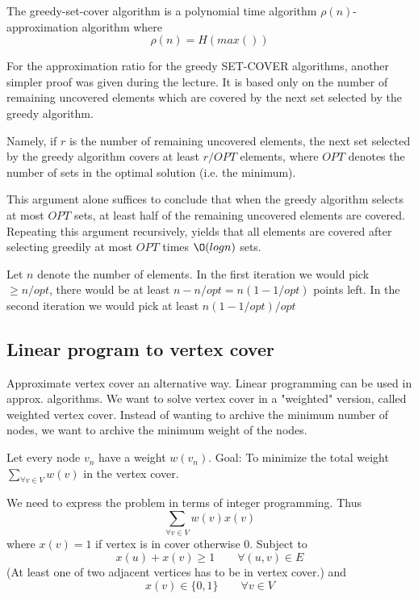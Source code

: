 \documentclass[10pt]{article}
\begin{document}
The greedy-set-cover algorithm is a polynomial time algorithm $\rho(n)$-approximation algorithm where 
\begin{equation}
  \rho(n) = H(max())
\end{equation}

For the approximation ratio for the greedy SET-COVER algorithms, another simpler proof was given during the lecture. It is based only on the number of remaining uncovered elements which are covered by the next set selected by the greedy algorithm. 

Namely, if $r$ is the number of remaining uncovered elements, the next set selected by the greedy algorithm covers at least $r/OPT$ elements, where $OPT$ denotes the number of sets in the optimal solution (i.e. the minimum). 

This argument alone suffices to conclude that when the greedy algorithm selects at most $OPT$ sets, at least half of the remaining uncovered elements are covered. Repeating this argument recursively, yields that all elements are covered after selecting greedily at most $OPT$ times $\O(log n)$ sets.

Let $n$ denote the number of elements. In the first iteration we would pick $\geq n/opt$, there would be at least $n-n/opt=n(1-1/opt)$ points left. In the second iteration we would pick at least $n(1-1/opt)/opt$


\subsection{Linear program to vertex cover} %
\label{sub:linear_program_to_set_cover}
Approximate vertex cover an alternative way. Linear programming can be used in approx. algorithms. We want to solve vertex cover in a "weighted" version, called weighted vertex cover. Instead of wanting to archive the minimum number of nodes, we want to archive the minimum weight of the nodes.

Let every node $v_n$ have a weight $w(v_n)$. Goal: To minimize the total weight $\sum_{\forall v \in V} w(v)$ in the vertex cover. 

We need to express the problem in terms of integer programming. Thus
\begin{equation}
\sum_{\forall v \in V} w(v) x(v)  
\end{equation}
where $x(v)=1$ if vertex is in cover otherwise $0$. Subject to
\begin{equation}
  x(u)+x(v) \geq 1 \qquad \forall (u,v) \in E
\end{equation}
(At least one of two adjacent vertices has to be in vertex cover.) and
\begin{equation}
    x(v)  \in \{0,1\} \qquad \forall v \in V 
\end{equation}
\end{document}
